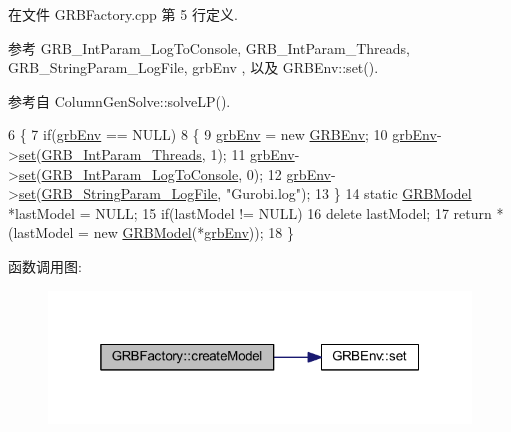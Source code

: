 在文件 G\+R\+B\+Factory.\+cpp 第 5 行定义.



参考 G\+R\+B\+\_\+\+Int\+Param\+\_\+\+Log\+To\+Console, G\+R\+B\+\_\+\+Int\+Param\+\_\+\+Threads, G\+R\+B\+\_\+\+String\+Param\+\_\+\+Log\+File, grb\+Env , 以及 G\+R\+B\+Env\+::set().



参考自 Column\+Gen\+Solve\+::solve\+L\+P().


\begin{DoxyCode}
6 \{
7     \textcolor{keywordflow}{if}(\hyperlink{classGRBFactory_af4f851ebdd232a3c3054f59078e2c2f5}{grbEnv} == NULL)
8     \{
9         \hyperlink{classGRBFactory_af4f851ebdd232a3c3054f59078e2c2f5}{grbEnv} = \textcolor{keyword}{new} \hyperlink{classGRBEnv}{GRBEnv};
10         \hyperlink{classGRBFactory_af4f851ebdd232a3c3054f59078e2c2f5}{grbEnv}->\hyperlink{classGRBEnv_a7f3ec7e37fbed1c7606ea52e18ed8a95}{set}(\hyperlink{gurobi__c_09_09_8h_ab02a171b88b53892fce22c6426a9d166a92b379cd1a568389f6ba4b6f8d1991ec}{GRB\_IntParam\_Threads}, 1);
11         \hyperlink{classGRBFactory_af4f851ebdd232a3c3054f59078e2c2f5}{grbEnv}->\hyperlink{classGRBEnv_a7f3ec7e37fbed1c7606ea52e18ed8a95}{set}(\hyperlink{gurobi__c_09_09_8h_ab02a171b88b53892fce22c6426a9d166a90160a82fabe018d22962d7b554b419b}{GRB\_IntParam\_LogToConsole}, 0);
12         \hyperlink{classGRBFactory_af4f851ebdd232a3c3054f59078e2c2f5}{grbEnv}->\hyperlink{classGRBEnv_a7f3ec7e37fbed1c7606ea52e18ed8a95}{set}(\hyperlink{gurobi__c_09_09_8h_a7ed46434ddcd973e46a3acd4d6c2cf04af3e55b4b2e1c8ecbb5a652b18d11197e}{GRB\_StringParam\_LogFile}, \textcolor{stringliteral}{"Gurobi.log"});
13     \}
14     \textcolor{keyword}{static} \hyperlink{classGRBModel}{GRBModel} *lastModel = NULL;
15     \textcolor{keywordflow}{if}(lastModel != NULL)
16         \textcolor{keyword}{delete} lastModel;
17     \textcolor{keywordflow}{return} *(lastModel = \textcolor{keyword}{new} \hyperlink{classGRBModel}{GRBModel}(*\hyperlink{classGRBFactory_af4f851ebdd232a3c3054f59078e2c2f5}{grbEnv}));
18 \}
\end{DoxyCode}


函数调用图\+:
\nopagebreak
\begin{figure}[H]
\begin{center}
\leavevmode
\includegraphics[width=319pt]{classGRBFactory_aadd50eacec778be1265b494b4348fe8c_cgraph}
\end{center}
\end{figure}




